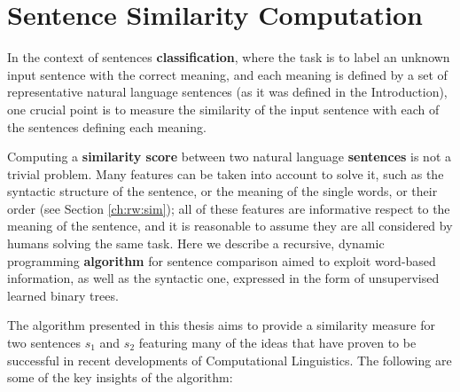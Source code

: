 
\chapter{Sentence Similarity Computation} %

\label{ch:M2} %


In the context of sentences \textbf{classification}, where the task is to label an unknown input sentence with the correct meaning, and each meaning is defined by a set of representative natural language sentences (as it was defined in the Introduction), one crucial point is to measure the similarity of the input sentence with each of the sentences defining each meaning.

Computing a \textbf{similarity score} between two natural language \textbf{sentences} is not a trivial problem. Many features can be taken into account to solve it, such as the syntactic structure of the sentence, or the meaning of the single words, or their order (see Section \ref{ch:rw:sim}); all of these features are informative respect to the meaning of the sentence, and it is reasonable to assume they are all considered by humans solving the same task. Here we describe a recursive, dynamic programming \textbf{algorithm} for sentence comparison aimed to exploit word-based information, as well as the syntactic one, expressed in the form of unsupervised learned binary trees.


The algorithm presented in this thesis aims to provide a similarity measure for two sentences $s_1$ and $s_2$ featuring many of the ideas that have proven to be successful in recent developments of Computational Linguistics. The following are some of the key insights of the algorithm:

